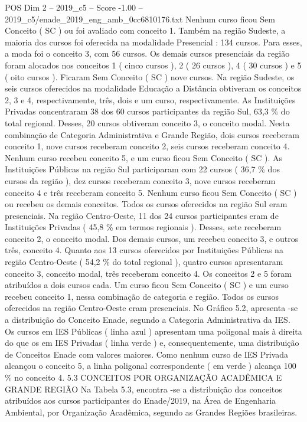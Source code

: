\begin{textsample}{POS Dim 2 – 2019\_c5 – Score -1.00 – 2019\_c5/enade\_2019\_eng\_amb\_0cc6810176.txt}
Nenhum curso ficou Sem Conceito ( SC ) ou foi avaliado com conceito 1.
Também na região Sudeste, a maioria dos cursos foi oferecida na modalidade Presencial : 134 cursos.
Para esses, a moda foi o conceito 3, com 56 cursos.
Os demais cursos presenciais da região foram alocados nos conceitos 1 ( cinco cursos ), 2 ( 26 cursos ), 4 ( 30 cursos ) e 5 ( oito cursos ).
Ficaram Sem Conceito ( SC ) nove cursos.
Na região Sudeste, os seis cursos oferecidos na modalidade Educação a Distância obtiveram os conceitos 2, 3 e 4, respectivamente, três, dois e um curso, respectivamente.
As Instituições Privadas concentraram 38 dos 60 cursos participantes da região Sul, 63,3 \% do total regional.
Desses, 20 cursos obtiveram conceito 3, o conceito modal.
Nesta combinação de Categoria Administrativa e Grande Região, dois cursos receberam conceito 1, nove cursos receberam conceito 2, seis cursos receberam conceito 4.
Nenhum curso recebeu conceito 5, e um curso ficou Sem Conceito ( SC ).
As Instituições Públicas na região Sul participaram com 22 cursos ( 36,7 \% dos cursos da região ), dez cursos receberam conceito 3, nove cursos receberam conceito 4 e três receberam conceito 5.
Nenhum curso ficou Sem Conceito ( SC ) ou recebeu os demais conceitos.
Todos os cursos oferecidos na região Sul eram presenciais.
Na região Centro-Oeste, 11 dos 24 cursos participantes eram de Instituições Privadas ( 45,8 \% em termos regionais ).
Desses, sete receberam conceito 2, o conceito modal.
Dos demais cursos, um recebeu conceito 3, e outros três, conceito 4.
Quanto aos 13 cursos oferecidos por Instituições Públicas na região Centro-Oeste ( 54,2 \% do total regional ), quatro cursos apresentaram conceito 3, conceito modal, três receberam conceito 4.
Os conceitos 2 e 5 foram atribuídos a dois cursos cada.
Um curso ficou Sem Conceito ( SC ) e um curso recebeu conceito 1, nessa combinação de categoria e região.
Todos os cursos oferecidos na região Centro-Oeste eram presenciais.
No Gráfico 5.2, apresenta -se a distribuição do Conceito Enade, segundo a Categoria Administrativa da IES.
Os cursos em IES Públicas ( linha azul ) apresentam uma poligonal mais à direita do que os em IES Privadas ( linha verde ) e, consequentemente, uma distribuição de Conceitos Enade com valores maiores.
Como nenhum curso de IES Privada alcançou o conceito 5, a linha poligonal correspondente ( em verde ) alcança 100 \% no conceito 4. 5.3 CONCEITOS POR ORGANIZAÇÃO ACADÊMICA E GRANDE REGIÃO Na Tabela 5.3, encontra -se a distribuição dos conceitos atribuídos aos cursos participantes do Enade/2019, na Área de Engenharia Ambiental, por Organização Acadêmica, segundo as Grandes Regiões brasileiras.

\end{textsample}
